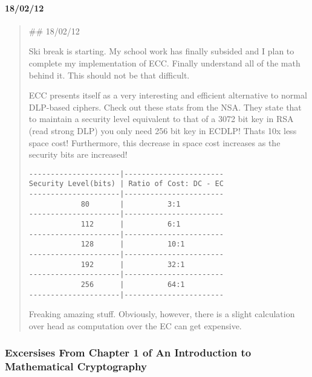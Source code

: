 \documentclass[12pt, a4paper, draft]{report}
\begin{document}
\paragraph*{18/02/12}
\begin{quote}
\#\# 18/02/12

Ski break is starting. My school work has finally subsided and I plan to
complete my implementation of ECC. Finally understand all of the math behind it.
This should not be that difficult.

ECC presents itself as a very interesting and efficient alternative to normal
DLP-based ciphers. Check out these stats from the NSA. They state that to maintain
a security level equivalent to that of a 3072 bit key in RSA (read strong DLP) you
only need 256 bit key in ECDLP! Thats 10x less space cost! Furthermore, this
decrease in space cost increases as the security bits are increased!

\begin{verbatim}
---------------------|-----------------------
Security Level(bits) | Ratio of Cost: DC - EC
---------------------|-----------------------
            80       |          3:1
---------------------|-----------------------
            112      |          6:1
---------------------|-----------------------
            128      |          10:1
---------------------|-----------------------
            192      |          32:1
---------------------|-----------------------
            256      |          64:1
---------------------|-----------------------
\end{verbatim}

Freaking amazing stuff. Obviously, however, there is a slight calculation over
head as computation over the EC can get expensive.
\end{quote}

\subsubsection*{Excersises From Chapter 1 of An
Introduction to Mathematical Cryptography}
\end{document}
